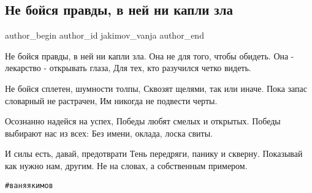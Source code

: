  
 
 
 
 
 
\subsection{Не бойся правды, в ней ни капли зла}
\label{sec:02_11_2020.fb.jakimov_vanja.1.ne_bojsja_pravdy}
\ifcmt
	author_begin
   author_id jakimov_vanja
	author_end
\fi

\begin{multicols}{2}
	\obeycr
Не бойся правды, в ней ни капли зла.
Она не для того, чтобы обидеть.
Она - лекарство - открывать глаза, 
Для тех, кто разучился четко видеть.

Не бойся сплетен, шумности толпы,
Сквозят щелями, так или иначе.
Пока запас словарный не растрачен,
Им никогда не подвести черты.

Осознанно надейся на успех,
Победы любят смелых и открытых.
Победы выбирают нас из всех:
Без имени, оклада, лоска свиты.

И силы есть, давай, предотврати
Тень передряги, панику и скверну.
Показывай как нужно нам, другим. 
Не на словах, а собственным примером.
	\restorecr
\end{multicols}

\verb|#ваняякимов|
